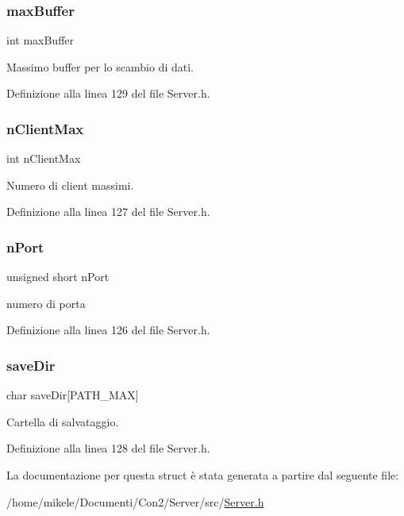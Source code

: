 \subsubsection{\texorpdfstring{maxBuffer}{maxBuffer}}
{\footnotesize\ttfamily int max\+Buffer}



Massimo buffer per lo scambio di dati. 



Definizione alla linea 129 del file Server.\+h.

\mbox{\label{a00068_a50f3e08f3d29e44b0b6d55cdac597798}} 
\subsubsection{\texorpdfstring{nClientMax}{nClientMax}}
{\footnotesize\ttfamily int n\+Client\+Max}



Numero di client massimi. 



Definizione alla linea 127 del file Server.\+h.

\mbox{\label{a00068_a54e0b59953588059d7149aaaac4a2a44}} 
\subsubsection{\texorpdfstring{nPort}{nPort}}
{\footnotesize\ttfamily unsigned short n\+Port}



numero di porta 



Definizione alla linea 126 del file Server.\+h.

\mbox{\label{a00068_a219f1b0b585c9cdd101f3699108ba191}} 
\subsubsection{\texorpdfstring{saveDir}{saveDir}}
{\footnotesize\ttfamily char save\+Dir\mbox{[}P\+A\+T\+H\+\_\+\+M\+AX\mbox{]}}



Cartella di salvataggio. 



Definizione alla linea 128 del file Server.\+h.



La documentazione per questa struct è stata generata a partire dal seguente file\+:\begin{DoxyCompactItemize}
\item 
/home/mikele/\+Documenti/\+Con2/\+Server/src/\mbox{\hyperlink{a00050}{Server.\+h}}\end{DoxyCompactItemize}
